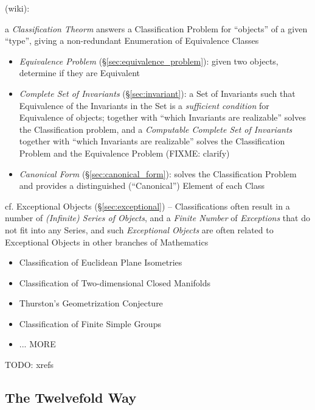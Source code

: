 (wiki):

a \emph{Classification Theorm} answers a Classification Problem for ``objects''
of a given ``type'', giving a non-redundant Enumeration of Equivalence Classes

\begin{itemize}
  \item \emph{Equivalence Problem} (\S\ref{sec:equivalence_problem}): given two
    objects, determine if they are Equivalent
  \item \emph{Complete Set of Invariants} (\S\ref{sec:invariant}): a Set of
    Invariants such that Equivalence of the Invariants in the Set is a
    \emph{sufficient condition} for Equivalence of objects; together with
    ``which Invariants are realizable'' solves the Classification problem, and a
    \emph{Computable Complete Set of Invariants} together with ``which
    Invariants are realizable'' solves the Classification Problem and the
    Equivalence Problem (FIXME: clarify)
  \item \emph{Canonical Form} (\S\ref{sec:canonical_form}): solves the
    Classification Problem and provides a distinguished (``Canonical'') Element
    of each Class
\end{itemize}

cf. Exceptional Objects (\S\ref{sec:exceptional}) -- Classifications often
result in a number of \emph{(Infinite) Series of Objects}, and a \emph{Finite
  Number} of \emph{Exceptions} that do not fit into any Series, and such
\emph{Exceptional Objects} are often related to Exceptional Objects in other
branches of Mathematics

\begin{itemize}
  \item Classification of Euclidean Plane Isometries
  \item Classification of Two-dimensional Closed Manifolds
  \item Thurston's Geometrization Conjecture
  \item Classification of Finite Simple Groups
  \item ... MORE
\end{itemize}

TODO: xrefs



\subsection{The Twelvefold Way}\label{sec:twelvefold_way}


